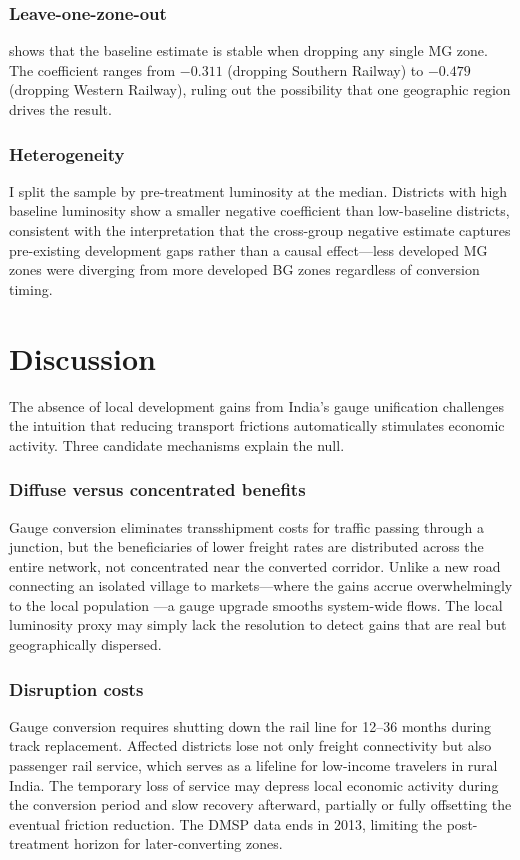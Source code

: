 \documentclass[12pt]{article}
\begin{document}


\subsubsection*{Leave-one-zone-out}  shows that the baseline estimate is stable when dropping any single MG zone. The coefficient ranges from $-0.311$ (dropping Southern Railway) to $-0.479$ (dropping Western Railway), ruling out the possibility that one geographic region drives the result.

\subsubsection*{Heterogeneity} I split the sample by pre-treatment luminosity at the median. Districts with high baseline luminosity show a smaller negative coefficient than low-baseline districts, consistent with the interpretation that the cross-group negative estimate captures pre-existing development gaps rather than a causal effect---less developed MG zones were diverging from more developed BG zones regardless of conversion timing.

\section{Discussion}
\label{sec:discussion}

The absence of local development gains from India's gauge unification challenges the intuition that reducing transport frictions automatically stimulates economic activity. Three candidate mechanisms explain the null.

\subsubsection*{Diffuse versus concentrated benefits} Gauge conversion eliminates transshipment costs for traffic passing through a junction, but the beneficiaries of lower freight rates are distributed across the entire network, not concentrated near the converted corridor. Unlike a new road connecting an isolated village to markets---where the gains accrue overwhelmingly to the local population \citep{asher2020rural}---a gauge upgrade smooths system-wide flows. The local luminosity proxy may simply lack the resolution to detect gains that are real but geographically dispersed.

\subsubsection*{Disruption costs} Gauge conversion requires shutting down the rail line for 12--36 months during track replacement. Affected districts lose not only freight connectivity but also passenger rail service, which serves as a lifeline for low-income travelers in rural India. The temporary loss of service may depress local economic activity during the conversion period and slow recovery afterward, partially or fully offsetting the eventual friction reduction. The DMSP data ends in 2013, limiting the post-treatment horizon for later-converting zones.
\end{document}
